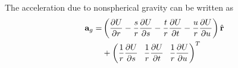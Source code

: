 The acceleration due to nonspherical gravity can be written as
%
\begin{equation}
   \begin{split}
   \mathbf{a}_g = & \left( \frac{\partial U}{\partial r} - \frac{s}{r}\frac{\partial U}{\partial s}
    -\frac{t}{r}\frac{\partial U}{\partial t} -\frac{u}{r}\frac{\partial U}{\partial u}
    \right) \hat{\mathbf{r}}\\
    & + \left( \frac{1}{r}\frac{\partial U}{\partial s} \hspace{.1
    in} \frac{1}{r}\frac{\partial U}{\partial t}  \hspace{.1
    in} \frac{1}{r}\frac{\partial U}{\partial u}\right)^T
    \end{split} \label{Eq:NonSphericalAcc}
\end{equation}
%


